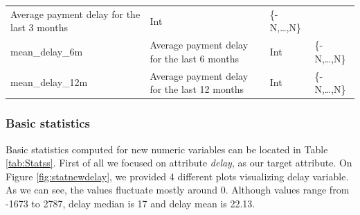 \documentclass[
]{article}
\begin{document}
\begin{longtable}[]{@{}llll@{}}
\begin{minipage}[t]{0.30\columnwidth}
Average payment delay for the last 3 months\strut
\end{minipage} & \begin{minipage}[t]{0.11\columnwidth}\raggedright
Int\strut
\end{minipage} & \begin{minipage}[t]{0.19\columnwidth}\raggedright
\{-N,\ldots,N\}\strut
\end{minipage}\tabularnewline
\begin{minipage}[t]{0.30\columnwidth}\raggedright
mean\_delay\_6m\strut
\end{minipage} & \begin{minipage}[t]{0.30\columnwidth}\raggedright
Average payment delay for the last 6 months\strut
\end{minipage} & \begin{minipage}[t]{0.11\columnwidth}\raggedright
Int\strut
\end{minipage} & \begin{minipage}[t]{0.19\columnwidth}\raggedright
\{-N,\ldots,N\}\strut
\end{minipage}\tabularnewline
\begin{minipage}[t]{0.30\columnwidth}\raggedright
mean\_delay\_12m\strut
\end{minipage} & \begin{minipage}[t]{0.30\columnwidth}\raggedright
Average payment delay for the last 12 months\strut
\end{minipage} & \begin{minipage}[t]{0.11\columnwidth}\raggedright
Int\strut
\end{minipage} & \begin{minipage}[t]{0.19\columnwidth}\raggedright
\{-N,\ldots,N\}\strut
\end{minipage}\tabularnewline
\bottomrule
\end{longtable}

\hypertarget{basic-statistics-1}{%
\subsubsection{Basic statistics}\label{basic-statistics-1}}

Basic statistics computed for new numeric variables can be located in Table \ref{tab:Statss}.
First of all we focused on attribute \emph{delay}, as our target attribute.
On Figure \ref{fig:statnewdelay}, we provided 4 different plots visualizing delay variable. As we can see, the values fluctuate mostly around 0. Although values range from -1673 to 2787, delay median is 17 and delay mean is 22.13.
\end{document}
